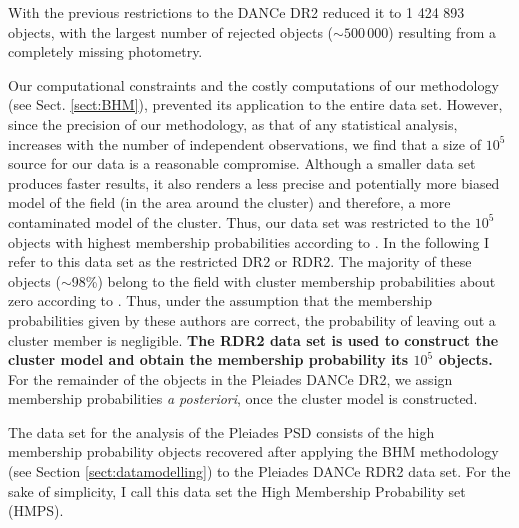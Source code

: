 With the previous restrictions to the DANCe DR2 reduced it to 1 424 893 objects, with the largest number of rejected objects ($\sim 500\, 000$) resulting from a completely missing photometry.


Our computational constraints and the costly computations of our methodology (see Sect. \ref{sect:BHM}), prevented its application to the entire data set. However, since the precision of our methodology, as that of any statistical analysis, increases with the number of independent observations, we find that a size of $10^5$ source for our data is a reasonable compromise. Although a smaller data set produces faster results, it also renders a less precise and potentially more biased model of the field (in the area around the cluster) and therefore, a more contaminated model of the cluster. Thus, our data set was restricted to the $10^5$ objects with highest membership probabilities according to \citet{Bouy2015}. In the following I refer to this data set as the restricted DR2 or RDR2. The majority of these objects ($\sim$98\%) belong to the field with cluster membership probabilities about zero according to \citet{Sarro2014,Bouy2015}. Thus, under the assumption that the membership probabilities given by these authors are correct, the probability of leaving out a cluster member is negligible. \textbf{The RDR2 data set is used to construct the cluster model and obtain the membership probability its $10^5$ objects. }For the remainder of the objects in the Pleiades DANCe DR2, we assign membership probabilities \emph{a posteriori}, once the cluster model is constructed. 

The data set for the analysis of the Pleiades PSD consists of the high membership probability objects recovered after applying the BHM methodology (see Section \ref{sect:datamodelling}) to the Pleiades DANCe RDR2 data set. For the sake of simplicity, I call this data set the High Membership Probability set (HMPS). 



